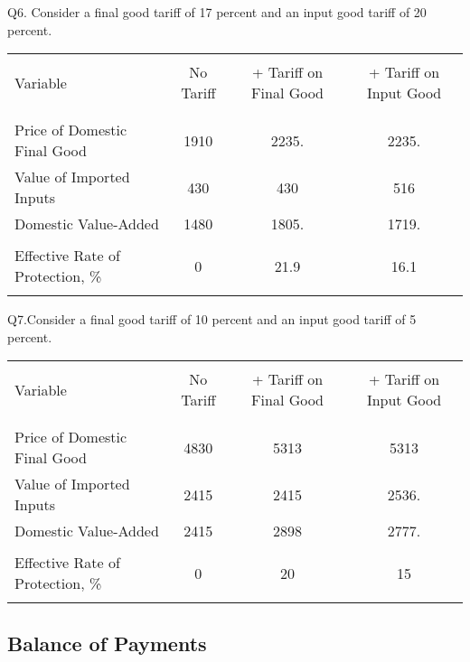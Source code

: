 \documentclass[12pt]{article}
\begin{document}
\bigskip

\noindent Q6. Consider a final good tariff of 17 percent and an input good tariff of 20 percent.

\begin{table}[!h]
	\centering
	\begin{tabular}[t]{l c c c}
		\hline
		&&&\\
		Variable & No Tariff & + Tariff on Final Good & + Tariff on Input Good \\
		&&&\\
		\hline
		&&&\\
		Price of Domestic Final Good & 1910 & 2235. & 2235.  \\
		Value of Imported Inputs & 430 & 430  & 516 \\
		Domestic Value-Added &	1480	&	 1805. & 1719.	\\
		&&&\\
		Effective Rate of Protection, \% &	0	&	 21.9  & 16.1 \\
		&&&\\
		\hline
	\end{tabular}
\end{table}

\bigskip

\noindent Q7.Consider a final good tariff of 10 percent and an input good tariff of 5 percent.

\begin{table}[!h]
	\centering
	\begin{tabular}[t]{l c c c}
		\hline
		&&&\\
		Variable & No Tariff & + Tariff on Final Good & + Tariff on Input Good \\
		&&&\\
		\hline
		&&&\\
		Price of Domestic Final Good & 4830 & 5313 & 5313 \\
		Value of Imported Inputs & 2415 & 2415 & 2536. \\
		Domestic Value-Added &	2415	&	2898	&	2777. \\
		&&&\\
		Effective Rate of Protection, \% &	0	& 20 & 15 \\
		&&&\\
		\hline
	\end{tabular}
\end{table}

\newpage

\subsection*{Balance of Payments}
\end{document}
